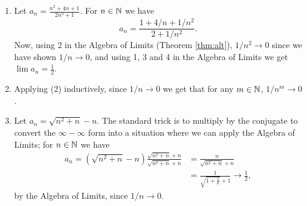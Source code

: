 \documentclass[../analysis1.tex]{subfiles}
\begin{document}
\begin{example}
    \begin{enumerate}
        \item[1.] Let $a_n=\frac{n^2+4n+1}{2n^2+1}$. For $n\in\mathbb{N}$ we have $$a_n=\frac{1+4/n+1/n^2}{2+1/n^2}.$$
        Now, using 2 in the Algebra of Limits (Theorem \ref{thm:alt}), $1/n^2\to 0$ since we have shown $1/n\to 0$, and using 1, 3 and 4 in the Algebra of Limits we get $\lim a_n=\frac{1}{2}$.
        \item[2.] Applying (2) inductively, since $1/n\to 0$ we get that for any $m\in\mathbb{N}$, $1/n^m\to 0$.
        \item[3.] Let $a_n=\sqrt{n^2+n}-n$. The standard trick is to multiply by the conjugate to convert the $\infty-\infty$ form into a situation where we can apply the Algebra of Limits; for $n\in\mathbb{N}$ we have
        \begin{align*}
            a_n=\left(\sqrt{n^2+n}-n\right)\frac{\sqrt{n^2+n}+n}{\sqrt{n^2+n}+n}&=\frac{n}{\sqrt{n^2+n}+n}\\
            &= \frac{1}{\sqrt{1+\frac{1}{n}}+1}\to \frac{1}{2},
        \end{align*}
        by the Algebra of Limits, since $1/n\to 0$.
    \end{enumerate}
\end{example}
\end{document}
